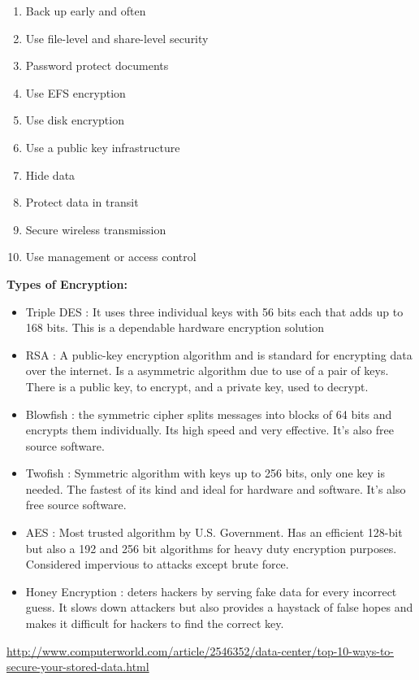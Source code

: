 \documentclass[]{book}
\providecommand{\tightlist}{%
  \setlength{\itemsep}{0pt}\setlength{\parskip}{0pt}}
\theoremstyle{definition}
\theoremstyle{definition}
\theoremstyle{remark}
\begin{document}
\begin{enumerate}
\def\labelenumi{\arabic{enumi}.}
\tightlist
\item
  Back up early and often
\item
  Use file-level and share-level security
\item
  Password protect documents
\item
  Use EFS encryption
\item
  Use disk encryption
\item
  Use a public key infrastructure
\item
  Hide data
\item
  Protect data in transit
\item
  Secure wireless transmission
\item
  Use management or access control
\end{enumerate}

\textbf{Types of Encryption:}

\begin{itemize}
\tightlist
\item
  Triple DES : It uses three individual keys with 56 bits each that adds
  up to 168 bits. This is a dependable hardware encryption solution
\item
  RSA : A public-key encryption algorithm and is standard for encrypting
  data over the internet. Is a asymmetric algorithm due to use of a pair
  of keys. There is a public key, to encrypt, and a private key, used to
  decrypt.
\item
  Blowfish : the symmetric cipher splits messages into blocks of 64 bits
  and encrypts them individually. Its high speed and very effective.
  It's also free source software.
\item
  Twofish : Symmetric algorithm with keys up to 256 bits, only one key
  is needed. The fastest of its kind and ideal for hardware and
  software. It's also free source software.
\item
  AES : Most trusted algorithm by U.S. Government. Has an efficient
  128-bit but also a 192 and 256 bit algorithms for heavy duty
  encryption purposes. Considered impervious to attacks except brute
  force.
\item
  Honey Encryption : deters hackers by serving fake data for every
  incorrect guess. It slows down attackers but also provides a haystack
  of false hopes and makes it difficult for hackers to find the correct
  key.
\end{itemize}

\url{http://www.computerworld.com/article/2546352/data-center/top-10-ways-to-secure-your-stored-data.html}
\end{document}
